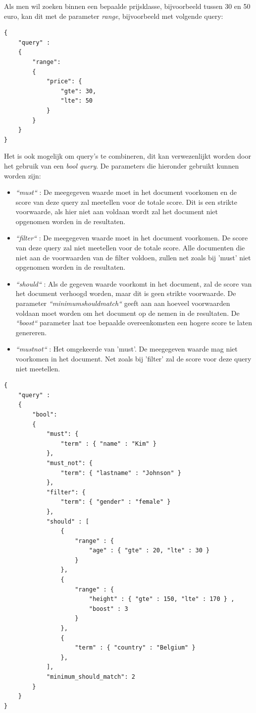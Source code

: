 Als men wil zoeken binnen een bepaalde prijsklasse, bijvoorbeeld tussen 30 en 50 euro, kan dit met de parameter \textit{range}, bijvoorbeeld met volgende query:

\begin{lstlisting}[caption={Bereik zoeken: Een query om alle documenten op te halen waarbij het veld 'price' tussen 30 en 50 ligt}]
{
	"query" : 
	{
		"range": 
		{
			"price": {
				"gte": 30,
				"lte": 50
			}
		}
	}
}
\end{lstlisting}


Het is ook mogelijk om query's te combineren, dit kan verwezenlijkt worden door het gebruik van een \textit{bool query}. De parameters die hieronder gebruikt kunnen worden zijn:

\begin{itemize}
	\setlength\itemsep{1em}
	\item \textit{``must``} : De meegegeven waarde moet in het document voorkomen en de score van deze query zal meetellen voor de totale score. Dit is een strikte voorwaarde, als hier niet aan voldaan wordt zal het document niet opgenomen worden in de resultaten.	
	\item \textit{``filter``} : De meegegeven waarde moet in het document voorkomen. De score van deze query zal niet meetellen voor de totale score. Alle documenten die niet aan de voorwaarden van de filter voldoen, zullen net zoals bij 'must' niet opgenomen worden in de resultaten.	
	\item \textit{``should``} : Als de gegeven waarde voorkomt in het document, zal de score van het document verhoogd worden, maar dit is geen strikte voorwaarde. De parameter \textit{``minimum\textunderscore should\textunderscore match``} geeft aan aan hoeveel voorwaarden voldaan moet worden om het document op de nemen in de resultaten. De \textit{``boost``} parameter laat toe bepaalde overeenkomsten een hogere score te laten genereren.
	\item \textit{``must\textunderscore not``} : Het omgekeerde van 'must'. De meegegeven waarde mag niet voorkomen in het document. Net zoals bij 'filter' zal de score voor deze query niet meetellen. 
\end{itemize}

\begin{lstlisting}[caption={Combineren: Voorbeeld van een 'bool' query}]
{
	"query" : 
	{
		"bool": 
		{
			"must": {
				"term" : { "name" : "Kim" }
			},
			"must_not": {
				"term": { "lastname" : "Johnson" }
			},
			"filter": {
				"term": { "gender" : "female" }
			},
			"should" : [
				{
					"range" : {
						"age" : { "gte" : 20, "lte" : 30 }
					}
				},
				{
					"range" : {
						"height" : { "gte" : 150, "lte" : 170 } ,
						"boost" : 3
					}
				},
				{
					"term" : { "country" : "Belgium" }
				},
			],
			"minimum_should_match": 2
		}
	}
}
\end{lstlisting}
 
